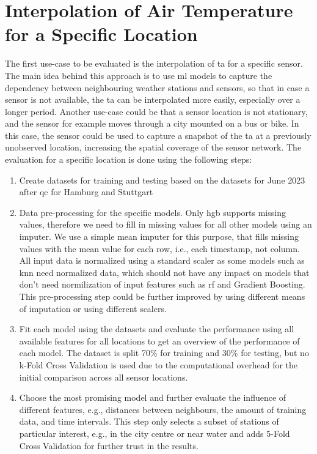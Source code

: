 \section{Interpolation of Air Temperature for a Specific Location}

The first use-case to be evaluated is the interpolation of \gls{ta} for a specific sensor. The main idea behind this approach is to use \gls{ml} models to capture the dependency between neighbouring weather stations and sensors, so that in case a sensor is not available, the \gls{ta} can be interpolated more easily, especially over a longer period. Another use-case could be that a sensor location is not stationary, and the sensor for example moves through a city mounted on a bus or bike. In this case, the sensor could be used to capture a snapshot of the \gls{ta} at a previously unobserved location, increasing the spatial coverage of the sensor network. The evaluation for a specific location is done using the following steps:

\begin{enumerate}
  \item Create datasets for training and testing based on the datasets for June 2023 after \gls{qc} for Hamburg and Stuttgart
  \item Data pre-processing for the specific models. Only \gls{hgb} supports missing values, therefore we need to fill in missing values for all other models using an imputer. We use a simple mean imputer for this purpose, that fills missing values with the mean value for each row, i.e., each timestamp, not column. All input data is normalized using a standard scaler as some models such as \gls{knn} need normalized data, which should not have any impact on models that don't need normilization of input features such as \gls{rf} and Gradient Boosting. This pre-processing step could be further improved by using different means of imputation or using different scalers.
  \item Fit each model using the datasets and evaluate the performance using all available features for all locations to get an overview of the performance of each model. The dataset is split 70\% for training and 30\% for testing, but no k-Fold Cross Validation is used due to the computational overhead for the initial comparison across all sensor locations.
  \item Choose the most promising model and further evaluate the influence of different features, e.g., distances between neighbours, the amount of training data, and time intervals. This step only selects a subset of stations of particular interest, e.g., in the city centre or near water and adds 5-Fold Cross Validation for further trust in the results.
\end{enumerate}

